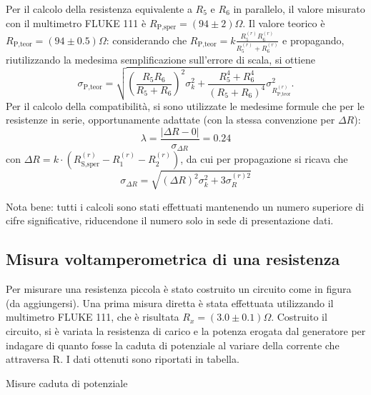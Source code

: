 Per il calcolo della resistenza equivalente a $R_5$ e $R_6$ in parallelo, il valore misurato con il multimetro FLUKE 111 \`e $R_{\textrm{P,sper}}= (94 \pm 2) \Omega$.
Il valore teorico \`e $R_{\textrm{P,teor}}=(94 \pm 0.5) \Omega$: considerando che $R_{\textrm{P,teor}}=k  \frac{R_5^{(r)} R_6^{(r)}}{R_5^{(r)} + R_6^{(r)}}$ e propagando, riutilizzando la medesima semplificazione sull'errore di scala, si ottiene 
\[\sigma_{\textrm{P,teor}}=\sqrt{\left(\frac{R_5 R_6}{R_5+R_6}\right)^2 \sigma_k^2 + \frac{R_5^4 + R_6^4}{(R_5 + R_6)^4}  \sigma_{R_{\textrm{P,teor}}^{(r)}}^2} .\]
Per il calcolo della compatibilit\`a, si sono utilizzate le medesime formule che per le resistenze in serie, opportunamente adattate (con la stessa convenzione per $\Delta R$):
\[\lambda=\frac{\left|\Delta R - 0\right|}{\sigma_{\Delta R}}=0.24\]
con $\Delta R = k\cdot(R_{\textrm{S,sper}}^{(r)}-R_1^{(r)}-R_2^{(r)})$, da cui per propagazione si ricava che 
\[ \sigma_{\Delta R} = 
        \sqrt{ (\Delta R)^2 \sigma_k^2 + 3 \sigma_R^{(r) 2} }\]



Nota bene: tutti i calcoli sono stati effettuati mantenendo un numero superiore di cifre significative, riducendone il numero solo in sede di presentazione dati.



 











\subsection{Misura voltamperometrica di una resistenza}
Per misurare una resistenza piccola \`e stato costruito un circuito come in figura (da aggiungersi). Una prima misura diretta \`e stata effettuata utilizzando il multimetro FLUKE 111, che \`e risultata $R_x=(3.0 \pm 0.1) \Omega$.
Costruito il circuito, si \`e variata la resistenza di carico e la potenza erogata dal generatore per indagare di quanto fosse la caduta di potenziale al variare della corrente che attraversa R. I dati ottenuti sono riportati in tabella. 

\begin{tabella}
	\centering
	
	\caption{Misure caduta di potenziale}
	\label{tab:02_tab_1.tex}
\end{tabella}

